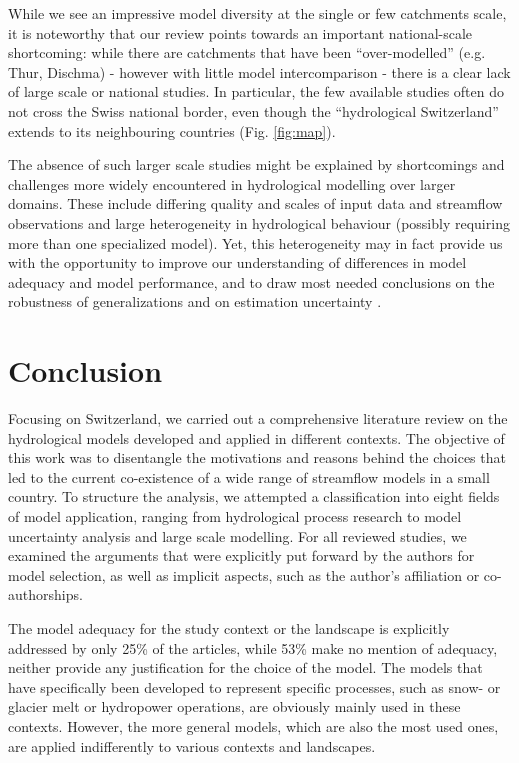 \documentclass[10pt,a4paper]{article}
\begin{document}
While we see an impressive model diversity at the single or few catchments scale, it is noteworthy that our review points towards an important national-scale shortcoming: while there are catchments that have been ``over-modelled'' (e.g. Thur, Dischma) - however with little model intercomparison - there is a clear lack of large scale or national studies. In particular, the few available studies often do not cross the Swiss national border, even though the ``hydrological Switzerland'' extends to its neighbouring countries (Fig. \ref{fig:map}).

The absence of such larger scale studies might be explained by shortcomings and challenges more widely encountered in hydrological modelling over larger domains. These include differing quality and scales of input data and streamflow observations and large heterogeneity in hydrological behaviour (possibly requiring more than one specialized model). Yet, this heterogeneity may in fact provide us with the opportunity to improve our understanding of differences in model adequacy and model performance, and to draw most needed conclusions on the robustness of generalizations and on estimation uncertainty \citep{Gupta_2014,McMillan_2016}.


\section{Conclusion}
\label{sec:conclusion}

Focusing on Switzerland, we carried out a comprehensive literature review on the hydrological models developed and applied in different contexts. The objective of this work was to disentangle the motivations and reasons behind the choices that led to the current co-existence of a wide range of streamflow models in a small country. To structure the analysis, we attempted a classification into eight fields of model application, ranging from hydrological process research to model uncertainty analysis and large scale modelling. For all reviewed studies, we examined the arguments that were explicitly put forward by the authors for model selection, as well as implicit aspects, such as the author's affiliation or co-authorships. 

The model adequacy for the study context or the landscape is explicitly addressed by only 25\% of the articles, while 53\% make no mention of adequacy, neither provide any justification for the choice of the model. The models that have specifically been developed to represent specific processes, such as snow- or glacier melt or hydropower operations, are obviously mainly used in these contexts. However, the more general models, which are also the most used ones, are applied indifferently to various contexts and landscapes.
\end{document}
